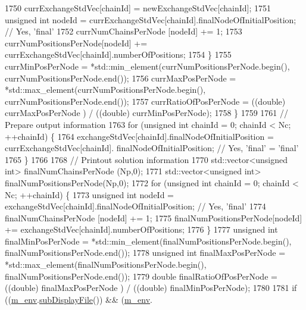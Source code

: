 \begin{DoxyCode}
1750       currExchangeStdVec[chainId] = newExchangeStdVec[chainId];
1751       \textcolor{keywordtype}{unsigned} \textcolor{keywordtype}{int} nodeId = currExchangeStdVec[chainId].finalNodeOfInitialPosition; \textcolor{comment}{// Yes, 'final'}
1752       currNumChainsPerNode   [nodeId] += 1;
1753       currNumPositionsPerNode[nodeId] += currExchangeStdVec[chainId].numberOfPositions;
1754     \}
1755     currMinPosPerNode = *std::min\_element(currNumPositionsPerNode.begin(), currNumPositionsPerNode.end());
1756     currMaxPosPerNode = *std::max\_element(currNumPositionsPerNode.begin(), currNumPositionsPerNode.end());
1757     currRatioOfPosPerNode = ((double) currMaxPosPerNode ) / ((double) currMinPosPerNode);
1758   \}
1759 
1761   \textcolor{comment}{// Prepare output information}
1763 \textcolor{comment}{}  \textcolor{keywordflow}{for} (\textcolor{keywordtype}{unsigned} \textcolor{keywordtype}{int} chainId = 0; chainId < Nc; ++chainId) \{
1764     exchangeStdVec[chainId].finalNodeOfInitialPosition = currExchangeStdVec[chainId].
      finalNodeOfInitialPosition; \textcolor{comment}{// Yes, 'final' = 'final'}
1765   \}
1766 
1768   \textcolor{comment}{// Printout solution information}
1770 \textcolor{comment}{}  std::vector<unsigned int> finalNumChainsPerNode   (Np,0);
1771   std::vector<unsigned int> finalNumPositionsPerNode(Np,0);
1772   \textcolor{keywordflow}{for} (\textcolor{keywordtype}{unsigned} \textcolor{keywordtype}{int} chainId = 0; chainId < Nc; ++chainId) \{
1773     \textcolor{keywordtype}{unsigned} \textcolor{keywordtype}{int} nodeId = exchangeStdVec[chainId].finalNodeOfInitialPosition; \textcolor{comment}{// Yes, 'final'}
1774     finalNumChainsPerNode   [nodeId] += 1;
1775     finalNumPositionsPerNode[nodeId] += exchangeStdVec[chainId].numberOfPositions;
1776   \}
1777   \textcolor{keywordtype}{unsigned} \textcolor{keywordtype}{int} finalMinPosPerNode = *std::min\_element(finalNumPositionsPerNode.begin(), 
      finalNumPositionsPerNode.end());
1778   \textcolor{keywordtype}{unsigned} \textcolor{keywordtype}{int} finalMaxPosPerNode = *std::max\_element(finalNumPositionsPerNode.begin(), 
      finalNumPositionsPerNode.end());
1779   \textcolor{keywordtype}{double} finalRatioOfPosPerNode = ((double) finalMaxPosPerNode ) / ((double) finalMinPosPerNode);
1780 
1781   \textcolor{keywordflow}{if} ((\hyperlink{class_q_u_e_s_o_1_1_m_l_sampling_a13f1ca4fe9f94822fe572a743eaced1d}{m\_env}.\hyperlink{class_q_u_e_s_o_1_1_base_environment_a8a0064746ae8dddfece4229b9ad374d6}{subDisplayFile}()) && (\hyperlink{class_q_u_e_s_o_1_1_m_l_sampling_a13f1ca4fe9f94822fe572a743eaced1d}{m\_env}.

\end{DoxyCode}

